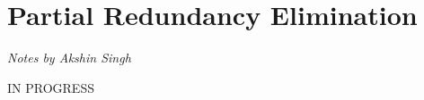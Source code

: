 \section{Partial Redundancy Elimination}
\begin{flushright}
\textit{Notes by Akshin Singh}
\end{flushright}

IN PROGRESS